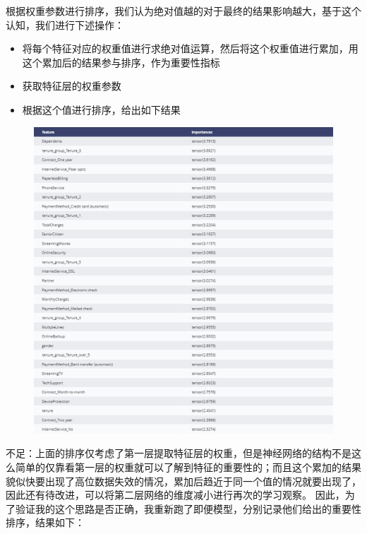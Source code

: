 \documentclass{article}
\begin{document}
根据权重参数进行排序，我们认为绝对值越的对于最终的结果影响越大，基于这个认知，我们进行下述操作：
\begin{itemize}
	\item 将每个特征对应的权重值进行求绝对值运算，然后将这个权重值进行累加，用这个累加后的结果参与排序，作为重要性指标
	\item 获取特征层的权重参数
	\item 根据这个值进行排序，给出如下结果
\end{itemize}
\begin{figure}[H]
	\centering
	\includegraphics[width=\textwidth]{./img/mlp_res1.png}
\end{figure}
不足：上面的排序仅考虑了第一层提取特征层的权重，但是神经网络的结构不是这么简单的仅靠看第一层的权重就可以了解到特征的重要性的；而且这个累加的结果貌似快要出现了高位数据失效的情况，累加后趋近于同一个值的情况就要出现了，因此还有待改进，可以将第二层网络的维度减小进行再次的学习观察。
因此，为了验证我的这个思路是否正确，我重新跑了即便模型，分别记录他们给出的重要性排序，结果如下：
\end{document}
